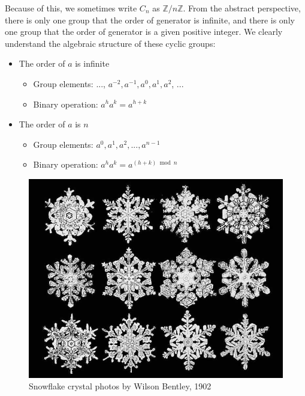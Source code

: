 \documentclass[b5paper]{article}
\begin{document}
Because of this, we sometimes write $C_n$ as $\mathbb{Z}/n\mathbb{Z}$. From the abstract perspective, there is only one group that the order of generator is infinite, and there is only one group that the order of generator is a given positive integer. We clearly understand the algebraic structure of these cyclic groups:

\begin{itemize}
\item The order of $a$ is infinite
  \begin{itemize}
  \item Group elements: ..., $a^{-2}, a^{-1}, a^0, a^1, a^2$, ...
  \item Binary operation: $a^ha^k = a^{h + k}$
  \end{itemize}
\item The order of $a$ is $n$
  \begin{itemize}
  \item Group elements: $a^0, a^1, a^2, ..., a^{n-1}$
  \item Binary operation: $a^ha^k = a^{(h + k) \bmod n}$
  \end{itemize}
\end{itemize}

\begin{figure}[htbp]
 \centering
 \includegraphics[scale=0.3]{img/snowflakes}
 \caption{Snowflake crystal photos by Wilson Bentley, 1902}
 \label{fig:snowflakes}
\end{figure}
\end{document}
